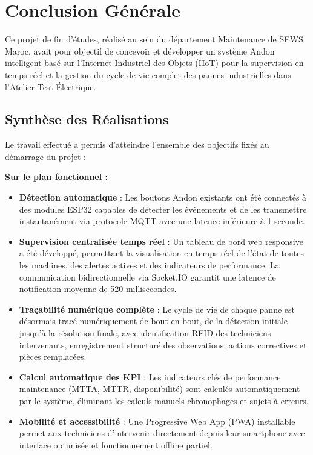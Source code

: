 ﻿%
\chapter*{Conclusion Générale}

Ce projet de fin d'études, réalisé au sein du département Maintenance de SEWS Maroc, avait pour objectif de concevoir et développer un système Andon intelligent basé sur l'Internet Industriel des Objets (IIoT) pour la supervision en temps réel et la gestion du cycle de vie complet des pannes industrielles dans l'Atelier Test Électrique.

\section*{Synthèse des Réalisations}

Le travail effectué a permis d'atteindre l'ensemble des objectifs fixés au démarrage du projet :

\textbf{Sur le plan fonctionnel :}
\begin{itemize}
    \item \textbf{Détection automatique} : Les boutons Andon existants ont été connectés à des modules ESP32 capables de détecter les événements et de les transmettre instantanément via protocole MQTT avec une latence inférieure à 1 seconde.
    
    \item \textbf{Supervision centralisée temps réel} : Un tableau de bord web responsive a été développé, permettant la visualisation en temps réel de l'état de toutes les machines, des alertes actives et des indicateurs de performance. La communication bidirectionnelle via Socket.IO garantit une latence de notification moyenne de 520 millisecondes.
    
    \item \textbf{Traçabilité numérique complète} : Le cycle de vie de chaque panne est désormais tracé numériquement de bout en bout, de la détection initiale jusqu'à la résolution finale, avec identification RFID des techniciens intervenants, enregistrement structuré des observations, actions correctives et pièces remplacées.
    
    \item \textbf{Calcul automatique des KPI} : Les indicateurs clés de performance maintenance (MTTA, MTTR, disponibilité) sont calculés automatiquement par le système, éliminant les calculs manuels chronophages et sujets à erreurs.
    
    \item \textbf{Mobilité et accessibilité} : Une Progressive Web App (PWA) installable permet aux techniciens d'intervenir directement depuis leur smartphone avec interface optimisée et fonctionnement offline partiel.
\end{itemize}

